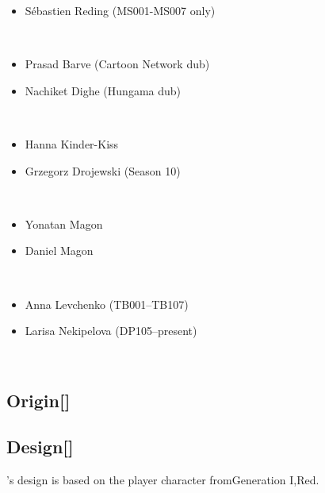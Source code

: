 \documentclass[a4paper,12pt]{article}
\begin{document}
\begin{itemize}
\item Sébastien Reding (MS001-MS007 only)
\end{itemize}\\ \par \vspace{0.5cm}

\begin{itemize}
\item Prasad Barve (Cartoon Network dub)
\item Nachiket Dighe (Hungama dub)
\end{itemize}\\ \par \vspace{0.5cm}

\begin{itemize}
\item Hanna Kinder-Kiss
\item Grzegorz Drojewski (Season 10)
\end{itemize}\\ \par \vspace{0.5cm}

\begin{itemize}
\item Yonatan Magon
\item Daniel Magon
\end{itemize}\\ \par \vspace{0.5cm}

\begin{itemize}
\item Anna Levchenko (TB001–TB107)
\item Larisa Nekipelova (DP105–present)
\end{itemize}\\ \par \vspace{0.5cm}

\subsection*{Origin[]}\n\n\subsection*{Design[]}\n\nAsh's design is based on the player character fromGeneration I,Red.\\ \par \vspace{0.5cm}
\end{document}
